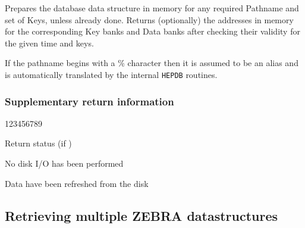 Prepares the database data structure in memory for any required
Pathname and set of Keys, unless already done.
Returns (optionally) the addresses in memory for the corresponding
Key banks and Data banks after checking their validity for the
given time and keys.

If the pathname begins with a \% character then it is assumed to be
an alias and is automatically translated by the internal {\tt HEPDB}
routines.

\subsubsection*{Supplementary return information}

\begin{DLtt}{123456789}
\item[IQUEST(2)]Return status (if )
%
  \begin{DLtt}{1}
    \item[0]No disk I/O has been performed
      \item[1]Data have been refreshed from the disk
\end{DLtt}
\end{DLtt}

\subsection{Retrieving multiple ZEBRA datastructures}


